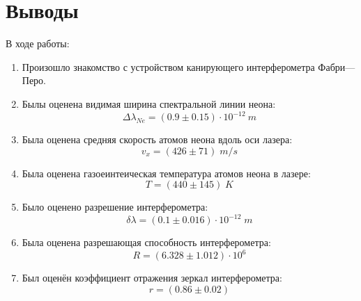 \documentclass{article}
\begin{document}
\section{Выводы}
В ходе работы:
\begin{enumerate}
  \item Произошло знакомство с устройством канирующего интерферометра Фабри—Перо.
  \item Былы оценена видимая ширина спектральной линии неона:
  \[ \Delta\lambda_{Ne} = \left( 0.9 \pm 0.15  \right)\cdot 10^{-12}\: m \]
  \item Была оценена средняя скорость атомов неона вдоль оси лазера:
  \[ v_x = \left( 426 \pm 71 \right)\; m/s \]
  \item Была оценена газоеинтеическая температура атомов неона в лазере:
  \[ T = \left(440 \pm 145 \right)\;K \]
  \item Было оценено разрешение интерферометра:
  \[ \delta\lambda = \left(0.1 \pm 0.016\right)\cdot 10^{-12}\;m \]
  \item Была оценена разрешающая способность интерферометра:
  \[ R = \left(6.328 \pm 1.012 \right)\cdot 10^6 \]
  \item Был оценён коэффициент отражения зеркал интерферометра:
  \[ r = \left(0.86 \pm 0.02 \right) \]
\end{enumerate}
\end{document}
